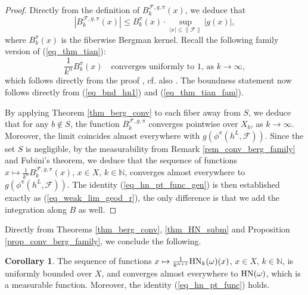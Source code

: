 \documentclass[12pt]{article}
\numberwithin{equation}{section}
\theoremstyle{theorem}
\theoremstyle{definition}
\newtheorem{cor}[thm]{Corollary}
\theoremstyle{remark}
\newcommand{\nat}{\mathbb{N}}
\begin{document}
	\begin{proof}
		Directly from the definition of $B_k^{\mathcal{F}, g, \pi}(x)$, we deduce that 
		\begin{equation}\label{eq_bnd_hn1}
			|B_k^{\mathcal{F}, g, \pi}(x)| \leq B^{\pi}_k(x) \cdot \sup_{|x| \leq  \| \mathcal{F} \|} |g(x)|,
		\end{equation}
		where $B^{\pi}_k(x)$ is the fiberwise Bergman kernel.
		Recall the following family version of (\ref{eq_thm_tian}):
		\begin{equation}\label{eq_thm_tian_fam}
			\frac{1}{k^n} B^{\pi}_k(x) \quad \text{converges uniformly to 1, as } k \to \infty,
		\end{equation}
		which follows directly from the proof \cite{DaiLiuMa}, cf. also \cite{MaZhangSuperconnBKPubl}.
		The boundness statement now follows directly from (\ref{eq_bnd_hn1}) and (\ref{eq_thm_tian_fam}).
		\par 
		By applying Theorem \ref{thm_berg_conv} to each fiber away from $S$, we deduce that for any $b \notin S$, the function $B_k^{\mathcal{F}, g, \pi}$ converges pointwise over $X_b$, as $k \to \infty$.
		Moreover, the limit coincides almost everywhere with $g(\phi^{\pi}(h^L, \mathcal{F}))$.
		Since the set $S$ is negligible, by the measurability from Remark \ref{rem_conv_berg_family} and Fubini's theorem, we deduce that the sequence of functions $x \mapsto \frac{1}{k^n} B_k^{\mathcal{F}, g, \pi}(x)$, $x \in X$, $k \in \nat$, converges almost everywhere to $g(\phi^{\pi}(h^L, \mathcal{F}))$.
		The identity (\ref{eq_hn_pt_func_gen}) is then established exactly as (\ref{eq_weak_lim_geod_r}), the only difference is that we add the integration along $B$ as well.
	\end{proof}
	\par
	Directly from Theorems \ref{thm_berg_conv}, \ref{thm_HN_subm} and Proposition \ref{prop_conv_berg_family}, we conclude the following.
	\begin{cor}\label{prop_conv_hn_pot}
		The sequence of functions $x \mapsto \frac{1}{k^{n + 1}} {\rm{HN}}_k(\omega)(x)$, $x \in X$, $k \in \nat$, is uniformly bounded over $X$, and converges almost everywhere to ${\rm{HN}}(\omega)$, which is a measurable function.
		Moreover, the identity (\ref{eq_hn_pt_func}) holds.
	\end{cor}
	
	
	
\end{document}
